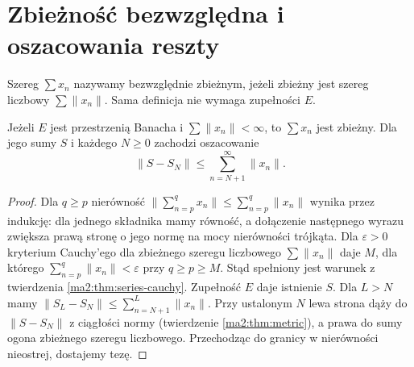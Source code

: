 \section{Zbieżność bezwzględna i oszacowania reszty}
\begin{definicja}
\label{ma2:def:absolute-series}
Szereg $\sum x_n$ nazywamy bezwzględnie zbieżnym, jeżeli
zbieżny jest szereg liczbowy $\sum\|x_n\|$.
Sama definicja nie wymaga zupełności $E$.
\end{definicja}
\begin{twierdzenie}
\label{ma2:thm:absolute-series}
Jeżeli $E$ jest przestrzenią Banacha i $\sum\|x_n\|<\infty$,
to $\sum x_n$ jest zbieżny. Dla jego sumy $S$ i każdego
$N\ge0$ zachodzi oszacowanie
\[
 \|S-S_N\|\le\sum_{n=N+1}^\infty\|x_n\|.
\]
\end{twierdzenie}
\begin{proof}
Dla $q\ge p$ nierówność
$\|\sum_{n=p}^q x_n\|\le\sum_{n=p}^q\|x_n\|$
wynika przez indukcję: dla jednego składnika mamy równość,
a dołączenie następnego wyrazu zwiększa prawą stronę o jego normę
na mocy nierówności trójkąta.
Dla $\varepsilon>0$ kryterium Cauchy'ego dla zbieżnego
szeregu liczbowego $\sum\|x_n\|$ daje $M$, dla którego
$\sum_{n=p}^q\|x_n\|<\varepsilon$ przy $q\ge p\ge M$.
Stąd spełniony jest warunek z twierdzenia
\ref{ma2:thm:series-cauchy}. Zupełność $E$ daje istnienie $S$.
Dla $L>N$ mamy
$\|S_L-S_N\|\le\sum_{n=N+1}^L\|x_n\|$.
Przy ustalonym $N$ lewa strona dąży do $\|S-S_N\|$
z ciągłości normy (twierdzenie \ref{ma2:thm:metric}),
a prawa do sumy ogona zbieżnego szeregu liczbowego.
Przechodząc do granicy w nierówności nieostrej, dostajemy tezę.
\end{proof}

